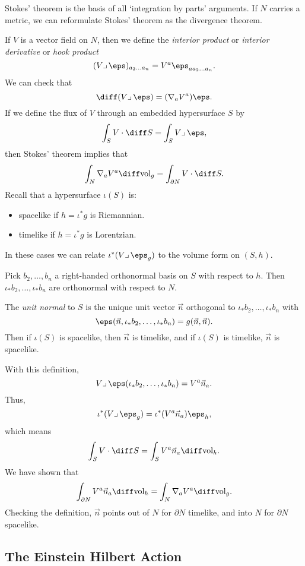 \documentclass[12pt]{article}
\begin{document}
Stokes' theorem is the basis of all `integration by parts' arguments. If $N$ carries a metric, we can reformulate Stokes' theorem as the divergence theorem.

If $V$ is a vector field on $N$, then we define the \emph{interior product} or \emph{interior derivative} or \emph{hook product}
\[
	(V \lrcorner \, \eps)_{a_2 \ldots a_n} = V^a \eps_{a a_2 \ldots a_n}.
\]
We can check that
\[
\diff (V \lrcorner \,\eps) = (\nabla_a V^a)\eps.
\]
If we define the flux of $V$ through an embedded hypersurface $S$ by
\[
\int_S V \cdot \diff S = \int_S V \lrcorner \, \eps,
\]
then Stokes' theorem implies that
\[
\int_N \nabla_a V^a \diff \mathrm{vol}_g = \int_{\partial N} V \cdot \diff S.
\]
Recall that a hypersurface $\iota(S)$ is:
\begin{itemize}
	\item spacelike if $h = \iota^{\ast} g$ is Riemannian.
	\item timelike if $h = \iota^{\ast} g$ is Lorentzian.
\end{itemize}
In these cases we can relate $\iota^{\ast}(V \lrcorner\, \eps_g)$ to the volume form on $(S, h)$.

Pick $b_2, \ldots, b_n$ a right-handed orthonormal basis on $S$ with respect to $h$. Then $\iota_\ast b_2, \ldots, \iota_\ast b_n$ are orthonormal with respect to $N$.

The \emph{unit normal} to $S$ is the unique unit vector $\vec n$ orthogonal to $\iota_\ast b_2, \ldots, \iota_\ast b_n$ with
\[
\eps(\vec n, \iota_\ast b_2, \ldots, \iota_\ast b_n) = g(\vec n, \vec n).
\]
Then if $\iota(S)$ is spacelike, then $\vec n$ is timelike, and if $\iota(S)$ is timelike, $\vec n$ is spacelike.

With this definition,
\[
V\lrcorner\,\eps(\iota_\ast b_2, \ldots,\iota_\ast b_n)=V^a\vec n_a.
\]
Thus,
\[
\iota^{\ast}(V\lrcorner\,\eps_g)=\iota^\ast(V^a\vec n_a)\eps_h,
\]
which means
\[
\int_S V\cdot\diff S=\int_SV^a\vec n_a\diff\mathrm{vol}_h.
\]
We have shown that
\[
\int_{\partial N}V^a\vec n_a\diff\mathrm{vol}_h=\int_N\nabla_aV^a\diff\mathrm{vol}_g.
\]
Checking the definition, $\vec n$ points out of $N$ for $\partial N$ timelike, and into $N$ for $\partial N$ spacelike.

\subsection{The Einstein Hilbert Action}%
\label{sub:eha}
\end{document}
